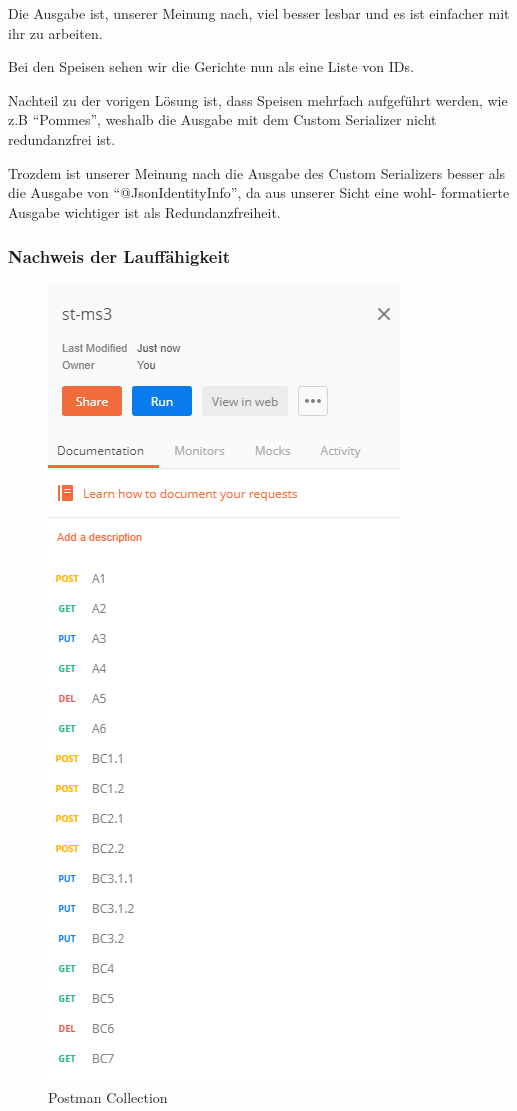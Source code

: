Die Ausgabe ist, unserer Meinung nach, viel besser lesbar
und es ist einfacher mit ihr zu arbeiten.

Bei den Speisen sehen wir die Gerichte nun als eine Liste
von IDs.

Nachteil zu der vorigen L\"osung ist, dass Speisen mehrfach
aufgef\"uhrt werden, wie z.B "`Pommes"', weshalb die
Ausgabe mit dem Custom Serializer nicht redundanzfrei ist.

Trozdem ist unserer Meinung nach die Ausgabe des Custom
Serializers besser als die Ausgabe von
"`@JsonIdentityInfo"', da aus unserer Sicht eine wohl-
formatierte Ausgabe wichtiger ist als Redundanzfreiheit.

\newpage

\subsubsection{Nachweis der Lauff\"ahigkeit}

\begin{figure}[H]
  \begin{center}
    \includegraphics{ms3/static/postman_collection.PNG}
  \end{center}
  \caption{Postman Collection}
\end{figure}

